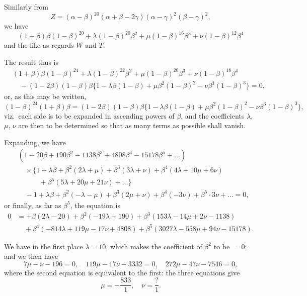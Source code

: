 \documentclass[11pt,a4paper]{book}
\begin{document}
Similarly from
\[
Z = (\alpha - \beta)^{20}(\alpha + \beta - 2\gamma)(\alpha - \gamma)^2(\beta - \gamma)^2,
\]
we have
\[
(1 + \beta)\beta(1 - \beta)^{20} + \lambda(1 - \beta)^{20}\beta^2 + \mu(1 - \beta)^{16}\beta^3 + \nu(1 - \beta)^{12}\beta^4
\]
and the like as regards $W$ and $T$.

The result thus is
\begin{align*}
&(1 + \beta)\beta(1 - \beta)^{24} + \lambda(1 - \beta)^{22}\beta^2 + \mu(1 - \beta)^{20}\beta^3 + \nu(1 - \beta)^{18}\beta^4\\
&\quad - (1 - 2\beta)(1 - \beta)\beta\{1 - \lambda\beta(1 - \beta) + \mu\beta^2(1 - \beta)^2 - \nu\beta^3(1 - \beta)^3\} = 0,
\end{align*}
or, as this may be written,
\[
(1 - \beta)^{24}(1 + \beta)\beta = (1 - 2\beta)(1 - \beta)\beta\{1 - \lambda\beta(1 - \beta) + \mu\beta^2(1 - \beta)^2 - \nu\beta^3(1 - \beta)^3\},
\]
viz.\ each side is to be expanded in ascending powers of $\beta$, and the coefficients $\lambda$, $\mu$, $\nu$ are then to be determined so that as many terms as possible shall vanish.

Expanding, we have
\begin{align*}
&(1 - 20\beta + 190\beta^2 - 1138\beta^3 + 4808\beta^4 - 15178\beta^5 + \ldots)\\
&\quad \times \{1 + \lambda\beta + \beta^2(2\lambda + \mu) + \beta^3(3\lambda + \nu) + \beta^4(4\lambda + 10\mu + 6\nu)\\
&\qquad\quad + \beta^5(5\lambda + 20\mu + 21\nu) + \ldots\}\\
&\quad - 1 + \lambda\beta + \beta^2(-\lambda - \mu) + \beta^3(2\mu + \nu) + \beta^4(-3\nu) + \beta^5 \cdot 3\nu + \ldots = 0,
\end{align*}
or finally, as far as $\beta^5$, the equation is
\begin{align*}
0 &= +\beta(2\lambda - 20) + \beta^2(-19\lambda + 190) + \beta^3(153\lambda - 14\mu + 2\nu - 1138)\\
&\quad + \beta^4(-814\lambda + 119\mu - 17\nu + 4808) + \beta^5(3027\lambda - 558\mu + 94\nu - 15178).
\end{align*}

We have in the first place $\lambda = 10$, which makes the coefficient of $\beta^2$ to be $= 0$; and we then have
\[
7\mu - \nu - 196 = 0, \quad 119\mu - 17\nu - 3332 = 0, \quad 272\mu - 47\nu - 7546 = 0,
\]
where the second equation is equivalent to the first: the three equations give
\[
\mu = -\frac{833}{1}, \quad \nu = \frac{?}{1}.
\]
\end{document}
